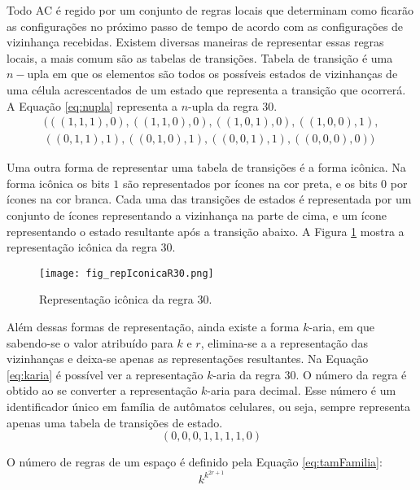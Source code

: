 Todo AC é regido por um conjunto de regras locais que determinam como ficarão as configurações no próximo passo de tempo de acordo com as configurações de vizinhança recebidas. Existem diversas maneiras de representar essas regras locais, a mais comum são as tabelas de transições. Tabela de transição é uma $n-$upla em que os elementos são todos os possíveis estados de vizinhanças de uma célula acrescentados de um estado que representa a transição que ocorrerá. A Equação \ref{eq:nupla} representa a $n$-upla da regra 30.
\begin{equation}
\begin{split}
(((1,1,1),0),((1,1,0),0),((1,0,1),0),((1,0,0),1),\\
((0,1,1),1),((0,1,0),1),((0,0,1),1),((0,0,0),0))
\label{eq:nupla}
\end{split}
\end{equation}

Uma outra forma de representar uma tabela de transições é a forma icônica. Na forma icônica os bits $1$ são representados por ícones na cor preta, e os bits $0$ por ícones na cor branca. Cada uma das transições de estados é representada por um conjunto de ícones representando a vizinhança na parte de cima, e um ícone representando o estado resultante após a transição abaixo. A Figura \ref{fig:repIconicaR30} mostra a representação icônica da regra 30.

	\begin{figure}[h!]
	  \centering
	  \texttt{[image: fig\_repIconicaR30.png]}
	  \caption{Representação icônica da regra 30.}
	  \label{fig:repIconicaR30}
	\end{figure}

Além dessas formas de representação, ainda existe a forma $k$-aria, em que sabendo-se o valor atribuído para $k$ e $r$, elimina-se a a representação das vizinhanças e deixa-se apenas as representações resultantes. Na Equação \ref{eq:karia} é possível ver a representação $k$-aria da regra 30. O número da regra é obtido ao se converter a representação $k$-aria para decimal. Esse número é um identificador único em família de autômatos celulares, ou seja, sempre representa apenas uma tabela de transições de estado.
\begin{equation}
(0,0,0,1,1,1,1,0)
\label{eq:karia}
\end{equation}

O número de regras de um espaço é definido pela Equação \ref{eq:tamFamilia}:
\begin{equation}
k^{k^{2r+1}}
\label{eq:tamFamilia}
\end{equation}

